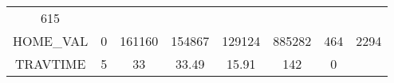 \documentclass[]{article}
\begin{document}
\begin{longtable}[]{@{}cccccccc@{}}
\begin{minipage}[t]{0.14\columnwidth}
615\strut
\end{minipage}\tabularnewline
\begin{minipage}[t]{0.11\columnwidth}\centering\strut
HOME\_VAL\strut
\end{minipage} & \begin{minipage}[t]{0.07\columnwidth}\centering\strut
0\strut
\end{minipage} & \begin{minipage}[t]{0.09\columnwidth}\centering\strut
161160\strut
\end{minipage} & \begin{minipage}[t]{0.09\columnwidth}\centering\strut
154867\strut
\end{minipage} & \begin{minipage}[t]{0.09\columnwidth}\centering\strut
129124\strut
\end{minipage} & \begin{minipage}[t]{0.09\columnwidth}\centering\strut
885282\strut
\end{minipage} & \begin{minipage}[t]{0.13\columnwidth}\centering\strut
464\strut
\end{minipage} & \begin{minipage}[t]{0.14\columnwidth}\centering\strut
2294\strut
\end{minipage}\tabularnewline
\begin{minipage}[t]{0.11\columnwidth}\centering\strut
TRAVTIME\strut
\end{minipage} & \begin{minipage}[t]{0.07\columnwidth}\centering\strut
5\strut
\end{minipage} & \begin{minipage}[t]{0.09\columnwidth}\centering\strut
33\strut
\end{minipage} & \begin{minipage}[t]{0.09\columnwidth}\centering\strut
33.49\strut
\end{minipage} & \begin{minipage}[t]{0.09\columnwidth}\centering\strut
15.91\strut
\end{minipage} & \begin{minipage}[t]{0.09\columnwidth}\centering\strut
142\strut
\end{minipage} & \begin{minipage}[t]{0.13\columnwidth}\centering\strut
0\strut
\end{minipage} & \begin{minipage}[t]{0.14\columnwidth}\centering\strut

\end{minipage}
\end{longtable}
\end{document}

